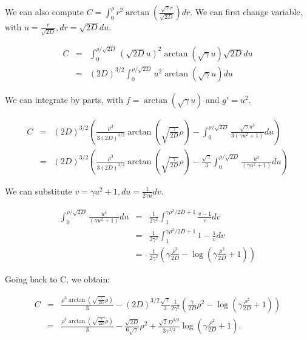 \documentclass[english]{article}
\begin{document}
We can also compute $C=\int_{0}^{\rho}r^{2}\arctan\left(\frac{\sqrt{\gamma}r}{\sqrt{2D}}\right)dr$.
We can first change variable, with $u=\frac{r}{\sqrt{2D}},$$dr=\sqrt{2D}du$.

\begin{equation}
\begin{array}{ccc}
C & = & \int_{0}^{\rho/\sqrt{2D}}(\sqrt{2D}u)^{2}\arctan(\sqrt{\gamma}u)\sqrt{2D}du\\
 & = & (2D)^{3/2}\int_{0}^{\rho/\sqrt{2D}}u^{2}\arctan(\sqrt{\gamma}u)du
\end{array}
\end{equation}

We can integrate by parts, with $f=\arctan(\sqrt{\gamma}u)$ and $g'=u^{2}$.

\begin{equation}
\begin{array}{ccc}
C & = & (2D)^{3/2}\left(\frac{\rho^{3}}{3(2D)^{3/2}}\arctan(\sqrt{\frac{\gamma}{2D}}\rho)-\int_{0}^{\rho/\sqrt{2D}}\frac{\sqrt{\gamma}u^{3}}{3(\gamma u^{2}+1)}du\right)\\
 & = & (2D)^{3/2}\left(\frac{\rho^{3}}{3(2D)^{3/2}}\arctan(\sqrt{\frac{\gamma}{2D}}\rho)-\frac{\sqrt{\gamma}}{3}\int_{0}^{\rho/\sqrt{2D}}\frac{u^{3}}{(\gamma u^{2}+1)}du\right)
\end{array}
\end{equation}

We can substitute $v=\gamma u^{2}+1,$$du=\frac{1}{2\gamma u}dv$.

\begin{equation}
\begin{array}{ccc}
\int_{0}^{\rho/\sqrt{2D}}\frac{u^{3}}{(\gamma u^{2}+1)}du & = & \frac{1}{2\gamma^{2}}\int_{1}^{\gamma\rho^{2}/2D+1}\frac{v-1}{v}dv\\
 & = & \frac{1}{2\gamma^{2}}\int_{1}^{\gamma\rho^{2}/2D+1}1-\frac{1}{v}dv\\
 & = & \frac{1}{2\gamma^{2}}(\gamma\frac{\rho^{2}}{2D}-\log(\gamma\frac{\rho^{2}}{2D}+1))
\end{array}
\end{equation}

Going back to C, we obtain:

\begin{equation}
\begin{array}{ccc}
C & = & \frac{\rho^{3}\arctan(\sqrt{\frac{\gamma}{2D}}\rho)}{3}-\left(2D\right)^{3/2}\frac{\sqrt{\gamma}}{3}\frac{1}{2\gamma^{2}}\left(\frac{\gamma}{2D}\rho^{2}-\log(\gamma\frac{\rho^{2}}{2D}+1)\right)\\
 & = & \frac{\rho^{3}\arctan(\sqrt{\frac{\gamma}{2D}}\rho)}{3}-\frac{\sqrt{2D}}{6\sqrt{\gamma}}\rho^{2}+\frac{\sqrt{2}D^{3/2}}{3\gamma^{3/2}}\log(\gamma\frac{\rho^{2}}{2D}+1).
\end{array}
\end{equation}
\end{document}
